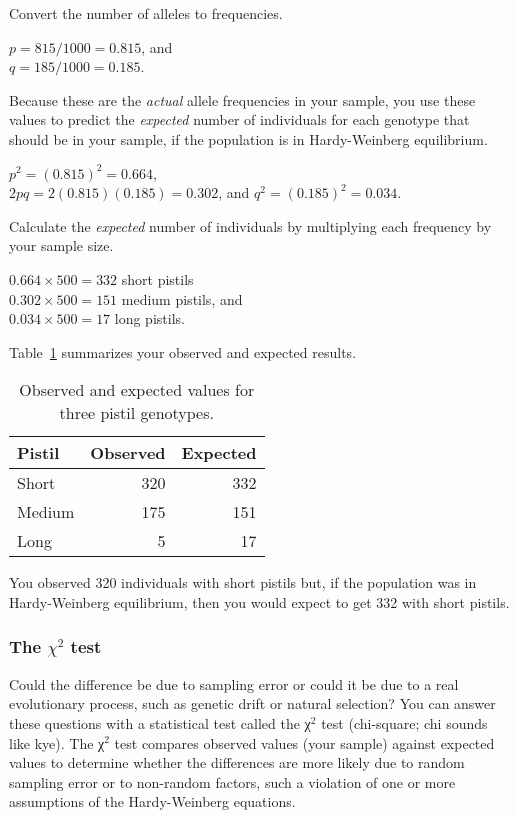 \documentclass[12pt]{exam}
\begin{document}
\begin{questions}
Convert the number of alleles to frequencies.

$p = 815/1000 = 0.815$, and\\
$q = 185/1000 = 0.185$.

Because these are the \emph{actual} allele frequencies in your sample, you use these values to predict the \emph{expected} number of individuals for each genotype that should be in your sample, if the population is in Hardy-Weinberg equilibrium.


$p^2 = (0.815)^2 = 0.664$,\\
$2pq = 2(0.815)(0.185) = 0.302$, and
$q^2 = (0.185)^2 = 0.034$.

Calculate the \emph{expected} number of individuals by multiplying each frequency by your sample size.

$0.664 \times 500 = 332$ short pistils\\
$0.302 \times 500 = 151$ medium pistils, and\\
$0.034 \times 500 = 17$ long pistils.

Table~\ref{tab:obs_exp} summarizes your observed and expected results.

{\setlength{\LTcapwidth}{2.2in}
\begin{longtable}[c]{lrr}
\caption{Observed and expected values for three pistil genotypes.\label{tab:obs_exp}} \tabularnewline
\toprule
Pistil	&	Observed	&	Expected \tabularnewline
\midrule
Short	&	320	&	332	\tabularnewline
Medium	&	175	&	151	\tabularnewline
Long	&	5	&	17  \tabularnewline
\bottomrule
\end{longtable}}


You observed 320 individuals with short pistils but, if the population was in Hardy-Weinberg equilibrium, then you would expect to get 332 with short pistils. 

\subsubsection*{The $\chi^2$ test}

Could the difference be due to sampling error or could it be due to a real evolutionary process, such as genetic drift or natural selection? You can answer these questions with a statistical test called the χ$^2$ test (chi-square; chi sounds like kye). The χ$^2$ test compares observed values (your sample) against expected values to determine whether the differences are more likely due to random sampling error or to non-random factors, such a violation of one or more assumptions of the Hardy-Weinberg equations.


\end{questions}
\end{document}
